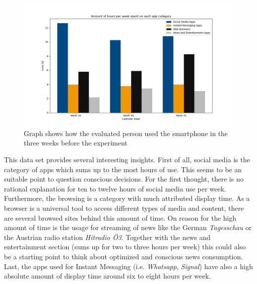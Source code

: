 \documentclass[11pt,letterpaper]{article}
\begin{document}
\begin{figure}[h]
\centering
\includegraphics[width = \textwidth]{../data/usage-times.png}
\caption{Graph shows how the evaluated person used the smartphone in the three weeks before the experiment}
\end{figure}

This data set provides several interesting insights. First of all, social media is the category of apps which sums up to the most hours of use. This seems to be an suitable point to question conscious decisions. For the first thought, there is no rational explanation for ten to twelve hours of social media use per week. Furthermore, the browsing is a category with much attributed display time. As a browser is a universal tool to access different types of media and content, there are several browsed sites behind this amount of time. On reason for the high amount of time is the usage for streaming of news like the German \textit{Tagesschau} or the Austrian radio station \textit{Hitradio Ö3}. Together with the news and entertainment section (sums up for two to three hours per week) this could also be a starting point to think about optimized and conscious news consumption. Last, the apps used for Instant Messaging (i.e. \textit{Whatsapp}, \textit{Signal}) have also a high absolute amount of display time around six to eight hours per week.
\end{document}
